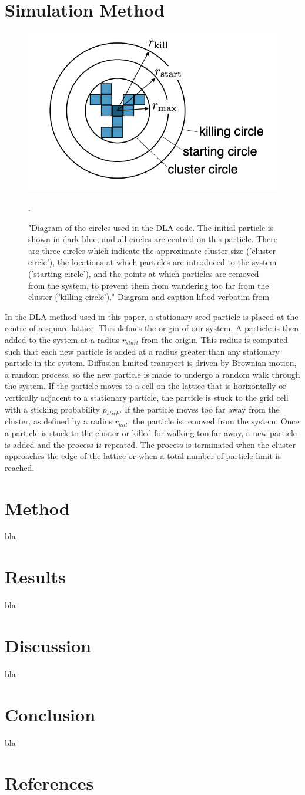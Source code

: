 \documentclass[11pt]{iopart}
\begin{document}
\section{Simulation Method}

\begin{figure}[h]
  \centering
  \includegraphics[width=0.5\linewidth]{images/circles.png}
  \caption{"Diagram of the circles used in the DLA code. The initial particle is shown in dark blue, and all circles are centred on this particle. There are three circles which indicate the approximate cluster size ('cluster circle'), the locations at which particles are introduced to the system ('starting circle'), and the points at which particles are removed from the system, to prevent them from wandering too far from the cluster ('killing circle')." Diagram and caption lifted verbatim from \cite{handout}}.
  \label{fig:circles}
\end{figure}

In the DLA method used in this paper, a stationary seed particle is placed at the centre of a square lattice. This defines the origin of our system. A particle is then added to the system at a radius $r_{start}$ from the origin. This radius is computed such that each new particle is added at a radius greater than any stationary particle in the system. Diffusion limited transport is driven by Brownian motion, a random process, so the new particle is made to undergo a random walk through the system. If the particle moves to a cell on the lattice that is horizontally or vertically adjacent to a stationary particle, the particle is stuck to the grid cell with a sticking probability $p_{stick}$. If the particle moves too far away from the cluster, as defined by a radius $r_{kill}$, the particle is removed from the system. Once a particle is stuck to the cluster or killed for walking too far away, a new particle is added and the process is repeated. The process is terminated when the cluster approaches the edge of the lattice or when a total number of particle limit is reached.
\section{Method}
bla

\section{Results}
bla

\section{Discussion}
bla

\section{Conclusion}
bla

\section*{References}


\end{document}

